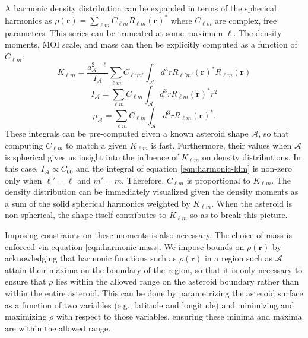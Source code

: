 A harmonic density distribution can be expanded in terms of the spherical harmonics as $\rho(\bm r) = \sum_{\ell m} C_{\ell m} R_{\ell m}(\bm r)^*$ where $C_{\ell m}$ are complex, free parameters. This series can be truncated at some maximum $\ell$. The density moments, MOI scale, and mass can then be explicitly computed as a function of $C_{\ell m}$:
\begin{equation}
  K_{\ell m} = \frac{a_\mathcal{A}^{2-\ell}}{I_\mathcal{A}} \sum_{\ell m} C_{\ell' m'} \int_\mathcal{A} d^3 r R_{\ell' m'}(\bm r)^* R_{\ell m}(\bm r)
  \label{eqn:harmonic-klm}
\end{equation}
\begin{equation}
  I_\mathcal{A} = \sum_{\ell m} C_{\ell m} \int_\mathcal{A} d^3 r R_{\ell m}(\bm r)^* r^2
  \label{eqn:harmonic-ia}
\end{equation}
\begin{equation}
  \mu_\mathcal{A} = \sum_{\ell m} C_{\ell m} \int_\mathcal{A} d^3 r R_{\ell m}(\bm r)^*.
  \label{eqn:harmonic-mass}
\end{equation}
These integrals can be pre-computed given a known asteroid shape $\mathcal{A}$, so that computing $C_{\ell m}$ to match a given $K_{\ell m}$ is fast. Furthermore, their values when $\mathcal{A}$ is spherical gives us insight into the influence of $K_{\ell m}$ on density distributions. In this case, $I_\mathcal{A} \propto C_{00}$ and the integral of equation \ref{eqn:harmonic-klm} is non-zero only when $\ell' = \ell$ and $m'=m$. Therefore, $C_{\ell m}$ is proportional to $K_{\ell m}$. The density distribution can be immediately visualized given the density moments as a sum of the solid spherical harmonics weighted by $K_{\ell m}$. When the asteroid is non-spherical, the shape itself contributes to $K_{\ell m}$ so as to break this picture.

Imposing constraints on these moments is also necessary. The choice of mass is enforced via equation \ref{eqn:harmonic-mass}. We impose bounds on $\rho(\bm r)$ by acknowledging that harmonic functions such as $\rho(\bm r)$ in a region such as $\mathcal{A}$ attain their maxima on the boundary of the region, so that it is only necessary to ensure that $\rho$ lies within the allowed range on the asteroid boundary rather than within the entire asteroid. This can be done by parametrizing the asteroid surface as a function of two variables (e.g., latitude and longitude) and minimizing and maximizing $\rho$ with respect to those variables, ensuring these minima and maxima are within the allowed range.




